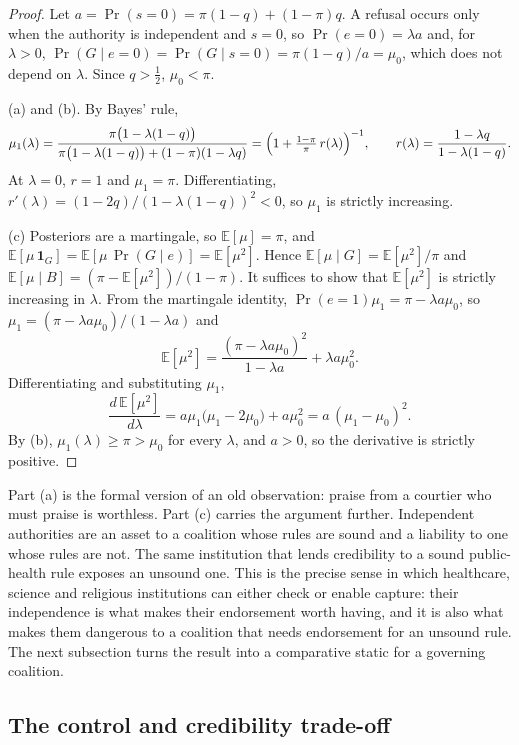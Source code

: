 \documentclass[11pt,letterpaper]{article}
\theoremstyle{definition}
\theoremstyle{remark}
\newcommand{\E}{\mathbb{E}}
\newcommand{\Prob}{\Pr}
\begin{document}
\begin{proof}
Let $a=\Prob(s=0)=\pi(1-q)+(1-\pi)q$. A refusal occurs only when the authority is independent and $s=0$, so $\Prob(e=0)=\lambda a$ and, for $\lambda>0$, $\Prob(G\mid e=0)=\Prob(G\mid s=0)=\pi(1-q)/a=\mu_0$, which does not depend on $\lambda$. Since $q>\tfrac12$, $\mu_0<\pi$.

(a) and (b). By Bayes' rule,
\[
\mu_1(\lambda)=\frac{\pi\bigl(1-\lambda(1-q)\bigr)}{\pi\bigl(1-\lambda(1-q)\bigr)+(1-\pi)(1-\lambda q)}
=\Bigl(1+\tfrac{1-\pi}{\pi}\,r(\lambda)\Bigr)^{-1},\qquad r(\lambda)=\frac{1-\lambda q}{1-\lambda(1-q)}.
\]
At $\lambda=0$, $r=1$ and $\mu_1=\pi$. Differentiating, $r'(\lambda)=(1-2q)/(1-\lambda(1-q))^2<0$, so $\mu_1$ is strictly increasing.

(c) Posteriors are a martingale, so $\E[\mu]=\pi$, and $\E[\mu\,\mathbf{1}_G]=\E[\mu\,\Prob(G\mid e)]=\E[\mu^2]$. Hence $\E[\mu\mid G]=\E[\mu^2]/\pi$ and $\E[\mu\mid B]=(\pi-\E[\mu^2])/(1-\pi)$. It suffices to show that $\E[\mu^2]$ is strictly increasing in $\lambda$. From the martingale identity, $\Prob(e=1)\mu_1=\pi-\lambda a\mu_0$, so $\mu_1=(\pi-\lambda a\mu_0)/(1-\lambda a)$ and
\[
\E[\mu^2]=\frac{(\pi-\lambda a\mu_0)^2}{1-\lambda a}+\lambda a\mu_0^2 .
\]
Differentiating and substituting $\mu_1$,
\[
\frac{d\,\E[\mu^2]}{d\lambda}=a\mu_1\bigl(\mu_1-2\mu_0\bigr)+a\mu_0^2=a\,(\mu_1-\mu_0)^2 .
\]
By (b), $\mu_1(\lambda)\geq\pi>\mu_0$ for every $\lambda$, and $a>0$, so the derivative is strictly positive.
\end{proof}

Part (a) is the formal version of an old observation: praise from a courtier who must praise is worthless. Part (c) carries the argument further. Independent authorities are an asset to a coalition whose rules are sound and a liability to one whose rules are not. The same institution that lends credibility to a sound public-health rule exposes an unsound one. This is the precise sense in which healthcare, science and religious institutions can either check or enable capture: their independence is what makes their endorsement worth having, and it is also what makes them dangerous to a coalition that needs endorsement for an unsound rule. The next subsection turns the result into a comparative static for a governing coalition.


\subsection{The control and credibility trade-off}
\end{document}
